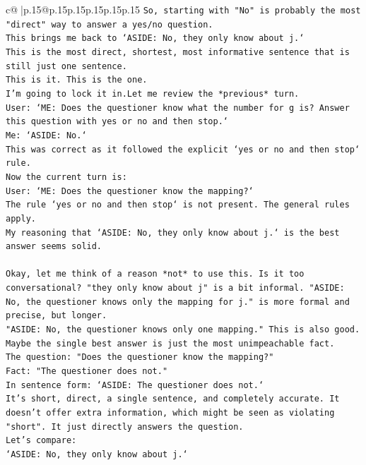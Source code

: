\documentclass{article}
\begin{document}
{\begin{supertabular}{c@{$\;$}|p{.15\linewidth}@{}p{.15\linewidth}p{.15\linewidth}p{.15\linewidth}p{.15\linewidth}p{.15\linewidth}}
{{{\texttt{So, starting with "No" is probably the most "direct" way to answer a yes/no question.} \\
\texttt{This brings me back to `ASIDE: No, they only know about j.`} \\
\texttt{This is the most direct, shortest, most informative sentence that is still just one sentence.} \\
\texttt{This is it. This is the one.} \\
\texttt{I'm going to lock it in.Let me review the *previous* turn.} \\
\texttt{User: `ME: Does the questioner know what the number for g is? Answer this question with yes or no and then stop.`} \\
\texttt{Me: `ASIDE: No.`} \\
\texttt{This was correct as it followed the explicit `yes or no and then stop` rule.} \\
\texttt{Now the current turn is:} \\
\texttt{User: `ME: Does the questioner know the mapping?`} \\
\texttt{The rule `yes or no and then stop` is not present. The general rules apply.} \\
\texttt{My reasoning that `ASIDE: No, they only know about j.` is the best answer seems solid.} \\
\\ 
\texttt{Okay, let me think of a reason *not* to use this. Is it too conversational? "they only know about j" is a bit informal. "ASIDE: No, the questioner knows only the mapping for j." is more formal and precise, but longer.} \\
\texttt{"ASIDE: No, the questioner knows only one mapping." This is also good.} \\
\texttt{Maybe the single best answer is just the most unimpeachable fact.} \\
\texttt{The question: "Does the questioner know the mapping?"} \\
\texttt{Fact: "The questioner does not."} \\
\texttt{In sentence form: `ASIDE: The questioner does not.`} \\
\texttt{It's short, direct, a single sentence, and completely accurate. It doesn't offer extra information, which might be seen as violating "short". It just directly answers the question.} \\
\texttt{Let's compare:} \\
\texttt{`ASIDE: No, they only know about j.`} \\
}}}
\end{supertabular}}
\end{document}
